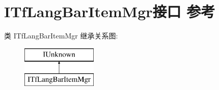 \hypertarget{interface_i_tf_lang_bar_item_mgr}{}\section{I\+Tf\+Lang\+Bar\+Item\+Mgr接口 参考}
\label{interface_i_tf_lang_bar_item_mgr}
类 I\+Tf\+Lang\+Bar\+Item\+Mgr 继承关系图\+:\begin{figure}[H]
\begin{center}
\leavevmode
\includegraphics[height=2.000000cm]{interface_i_tf_lang_bar_item_mgr}
\end{center}
\end{figure}
